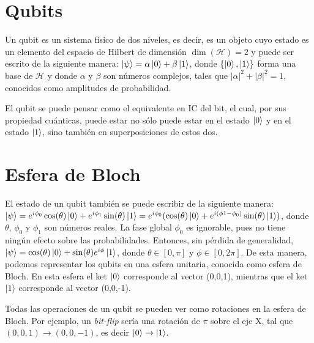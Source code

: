 \section{Qubits}
Un qubit es un sistema físico de dos niveles, es decir, es un objeto cuyo estado es un elemento del espacio de Hilbert de dimensión $\dim (\mathcal{H})=2$ y puede ser escrito de la siguiente manera: $ \ket{\psi} = \alpha \ket{0} + \beta \ket{1} $, donde $ \{ \ket{0},\ket{1} \} $ forma una base de $\mathcal{H}$ y donde $ \alpha $ y $ \beta $ son números complejos, tales que $ | \alpha |^2 + | \beta |^2 = 1 $, conocidos como amplitudes de probabilidad.

El qubit se puede pensar como el equivalente en IC del bit, el cual, por sus propiedad cuánticas, puede estar no sólo puede estar en el estado $\ket{0}$ y en el estado $\ket{1}$, sino también en superposiciones de estos dos.

\section{Esfera de Bloch}

El estado de un qubit también se puede escribir de la siguiente manera: $ \ket{\psi} = e^{i \phi_0} \cos ( \theta ) \ket{0} + e^{i \phi_1} \sin ( \theta ) \ket{1}  = e^{i \phi_0} (\cos ( \theta ) \ket{0} + e^{i ( \phi1 - \phi_0 )} \sin ( \theta ) \ket{1}) $, donde $ \theta $, $\phi_0$ y $\phi_1$ son números reales. La fase global $\phi_0$ es ignorable, pues no tiene ningún efecto sobre las probabilidades. Entonces, sin pérdida de generalidad, $ \ket{\psi} = \cos ( \theta ) \ket{0} + \sin ( \theta ) e^{i \phi} \ket{1} $, donde $ \theta \in [0, \pi ] $ y $ \phi \in [0, 2 \pi ] $. De esta manera, podemos representar los qubits en una esfera unitaria, conocida como esfera de Bloch. En esta esfera el ket $\ket{0}$ corresponde al vector (0,0,1), mientras que el ket $\ket{1}$ corresponde al vector (0,0,-1).

Todas las operaciones de un qubit se pueden ver como rotaciones en la esfera de Bloch. Por ejemplo, un \textit{bit-flip} sería una rotación de $\pi$ sobre el eje X, tal que $(0,0,1) \rightarrow (0,0,-1)$, es decir $\ket{0} \rightarrow \ket{1}$.

